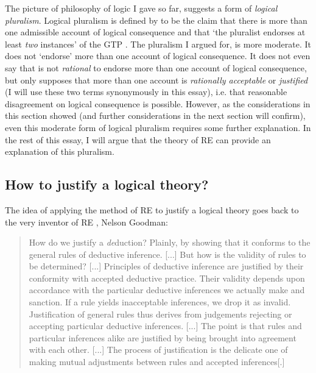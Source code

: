 \documentclass{article}
\begin{document}
The picture of philosophy of logic I gave so far, suggests a form of \textit{logical pluralism}. Logical pluralism is defined by  to be the claim that there is more than one admissible account of logical consequence and that `the pluralist endorses at least \textit{two} instances' of the GTP \cite[p.~29]{beallrestall}. The pluralism I argued for, is more moderate. It does not `endorse' more than one account of logical consequence. It does not even say that is not \textit{rational} to endorse more than one account of logical consequence, but only supposes that more than one account is \textit{rationally acceptable} or \textit{justified} (I will use these two terms synonymously in this essay), i.e. that reasonable disagreement on logical consequence is possible. However, as the considerations in this section showed (and further considerations in the next section will confirm), even this moderate form of logical pluralism requires some further explanation. In the rest of this essay, I will argue that the theory of RE can provide an explanation of this pluralism.

\subsection{How to justify a logical theory?}
The idea of applying the method of RE to justify a logical theory goes back to the very inventor of RE \cite{sep-reflective-equilibrium}, Nelson Goodman:
\begin{quote}\label{quote:goodman}
    How do we justify a \textit{de}duction? Plainly, by showing that it conforms to the general rules of deductive inference. [...] But how is the validity of rules to be determined? [...] Principles of deductive inference are justified by their conformity with accepted deductive practice. Their validity depends upon accordance with the particular deductive inferences we actually make and sanction. If a rule yields inacceptable inferences, we drop it as invalid. Justification of general rules thus derives from judgements rejecting or accepting particular deductive inferences. [...] The point is that rules and particular inferences alike are justified by being brought into agreement with each other. [...] The process of justification is the delicate one of making mutual adjustments between rules and accepted inferences[.] \cite[p. 63-64]{Goodman}
\end{quote}
\end{document}
